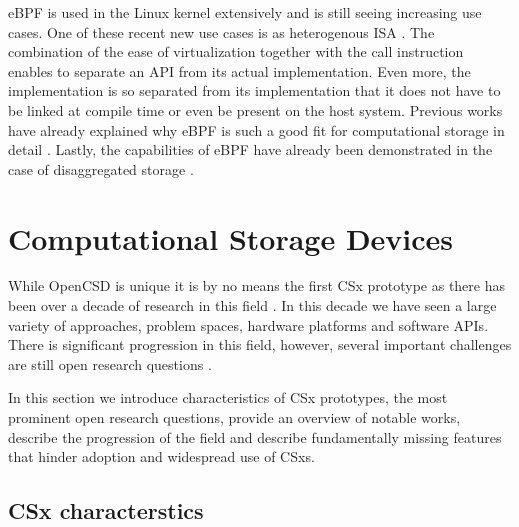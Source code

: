
eBPF is used in the Linux kernel extensively and is still seeing increasing use
cases. One of these recent new use cases is as heterogenous ISA \cite{bpf-uapi}.
The combination of the ease of virtualization together with the call instruction
enables to separate an API from its actual implementation. Even more, the
implementation is so separated from its implementation that it does not have to
be linked at compile time or even be present on the host system. Previous works
have already explained why eBPF is such a good fit for computational storage in
detail \cite{ebpf_cs_2021}. Lastly, the capabilities of eBPF have already been
demonstrated in the case of disaggregated storage \cite{kourtis2020safe}.

\section{Computational Storage Devices}

While OpenCSD is unique it is by no means the first CSx prototype as there
has been over a decade of research in this field \cite{lukken2021past}. In this
decade we have seen a large variety of approaches, problem spaces, hardware
platforms and software APIs. There is significant progression in this field, 
however, several important challenges are still open research
questions \cite{barbalacecomputational}.

In this section we introduce characteristics of CSx prototypes, the most
prominent open research questions, provide an overview of notable works,
describe the progression of the field and describe fundamentally missing
features that hinder adoption and widespread use of CSxs.





\subsection{CSx characterstics}

